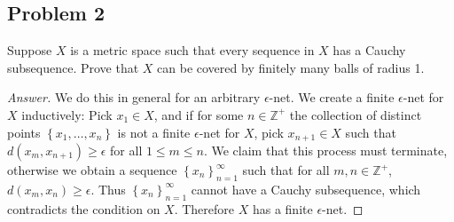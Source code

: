 \documentclass[12pt]{article}
\newcommand{\z}{\mathbb{Z}}
\newcommand\paren[1]{\left( #1 \right)}
\newcommand\setb[1]{\left \{ #1 \right \}}
\theoremstyle{definition}
\begin{document}
\subsection{Problem 2 \texorpdfstring{\cite{Rudin}}{}}
Suppose $X$ is a metric space such that every sequence in $X$ has a Cauchy subsequence. Prove that $X$ can be covered by finitely many balls of radius 1.
\begin{proof}[Answer]
    We do this in general for an arbitrary $\epsilon$-net. We create a finite $\epsilon$-net for $X$ inductively: Pick $x_1 \in X$, and if for some $n \in \z^+$ the collection of distinct points $\setb{ x_1 , \dotsc , x_n }$ is not a finite $\epsilon$-net for $X$, pick $x_{n+1} \in X$ such that $d \paren{ x_m , x_{n+1} } \geq \epsilon$ for all $1 \leq m \leq n$. We claim that this process must terminate, otherwise we obtain a sequence $\setb{ x_n }_{n = 1}^{\infty}$ such that for all $m , n \in \z^+$, $d \paren{ x_m , x_n } \geq \epsilon$. Thus $\setb{ x_n }_{n = 1}^{\infty}$ cannot have a Cauchy subsequence, which contradicts the condition on $X$. Therefore $X$ has a finite $\epsilon$-net.
\end{proof}
\end{document}
